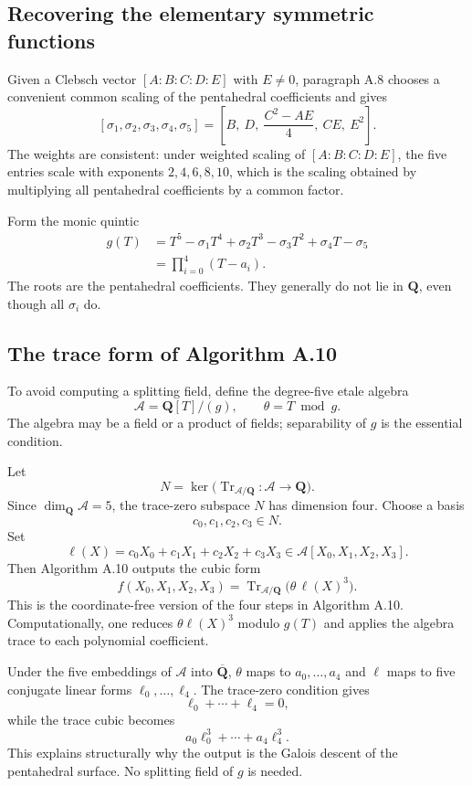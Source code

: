 \documentclass[11pt]{article}
\newcommand{\QQ}{\mathbf{Q}}
\newcommand{\ol}[1]{\overline{#1}}
\newcommand{\Tr}{\operatorname{Tr}}
\newcommand{\cA}{\mathscr{A}}
\begin{document}
\subsection{Recovering the elementary symmetric functions}

Given a Clebsch vector $[A:B:C:D:E]$ with $E\neq0$, paragraph A.8 chooses a
convenient common scaling of the pentahedral coefficients and gives
\[
 \boxed{
 [\sigma_1,\sigma_2,\sigma_3,\sigma_4,\sigma_5]
 =\left[B,\ D,\ \frac{C^2-AE}{4},\ CE,\ E^2\right].
 }
\]
The weights are consistent: under weighted scaling of
$[A:B:C:D:E]$, the five entries scale with exponents
$2,4,6,8,10$, which is the scaling obtained by multiplying all pentahedral
coefficients by a common factor.

Form the monic quintic
\[
\begin{aligned}
 g(T)
 &=T^5-\sigma_1T^4+\sigma_2T^3-\sigma_3T^2+\sigma_4T-\sigma_5\\
 &=\prod_{i=0}^{4}(T-a_i).
\end{aligned}
\]
The roots are the pentahedral coefficients.  They generally do not lie in
$\QQ$, even though all $\sigma_i$ do.

\subsection{The trace form of Algorithm A.10}

To avoid computing a splitting field, define the degree-five etale algebra
\[
  \cA=\QQ[T]/(g),
  \qquad \theta=T\bmod g.
\]
The algebra may be a field or a product of fields; separability of $g$ is the
essential condition.

Let
\[
  N=\ker\bigl(\Tr_{\cA/\QQ}:\cA\to\QQ\bigr).
\]
Since $\dim_{\QQ}\cA=5$, the trace-zero subspace $N$ has dimension four.
Choose a basis
\[
  c_0,c_1,c_2,c_3\in N.
\]
Set
\[
  \ell(X)=c_0X_0+c_1X_1+c_2X_2+c_3X_3\in\cA[X_0,X_1,X_2,X_3].
\]
Then Algorithm A.10 outputs the cubic form
\[
 \boxed{
  f(X_0,X_1,X_2,X_3)
  =\Tr_{\cA/\QQ}\bigl(\theta\,\ell(X)^3\bigr).
 }
\]
This is the coordinate-free version of the four steps in Algorithm A.10.
Computationally, one reduces $\theta\ell(X)^3$ modulo $g(T)$ and applies the
algebra trace to each polynomial coefficient.

Under the five embeddings of $\cA$ into $\ol\QQ$, $\theta$ maps to
$a_0,\ldots,a_4$ and $\ell$ maps to five conjugate linear forms
$\ell_0,\ldots,\ell_4$.  The trace-zero condition gives
\[
  \ell_0+\cdots+\ell_4=0,
\]
while the trace cubic becomes
\[
  a_0\ell_0^3+\cdots+a_4\ell_4^3.
\]
This explains structurally why the output is the Galois descent of the
pentahedral surface.  No splitting field of $g$ is needed.
\end{document}

